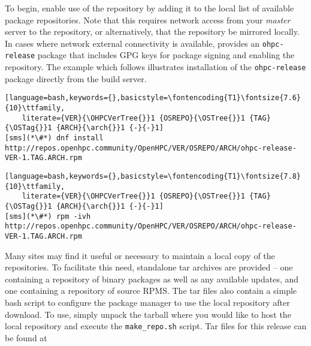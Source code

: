 To begin, enable use of the \OHPC{} repository by adding it to the local list
of available package repositories. Note that this requires network access from
your {\em master} server to the \OHPC{} repository, or alternatively, that
the \OHPC{} repository be mirrored locally.  In cases where network external
connectivity is available, \OHPC{} provides an \texttt{ohpc-release} package
that includes GPG keys for package signing and enabling the repository.  The
example which follows illustrates installation of the \texttt{ohpc-release}
package directly from the \OHPC{} build server.

\begin{lstlisting}[language=bash,keywords={},basicstyle=\fontencoding{T1}\fontsize{7.6}{10}\ttfamily,
	literate={VER}{\OHPCVerTree{}}1 {OSREPO}{\OSTree{}}1 {TAG}{\OSTag{}}1 {ARCH}{\arch{}}1 {-}{-}1]
[sms](*\#*) dnf install http://repos.openhpc.community/OpenHPC/VER/OSREPO/ARCH/ohpc-release-VER-1.TAG.ARCH.rpm
\end{lstlisting}
\else
\begin{lstlisting}[language=bash,keywords={},basicstyle=\fontencoding{T1}\fontsize{7.8}{10}\ttfamily,
	literate={VER}{\OHPCVerTree{}}1 {OSREPO}{\OSTree{}}1 {TAG}{\OSTag{}}1 {ARCH}{\arch{}}1 {-}{-}1]
[sms](*\#*) rpm -ivh http://repos.openhpc.community/OpenHPC/VER/OSREPO/ARCH/ohpc-release-VER-1.TAG.ARCH.rpm
\end{lstlisting}
\fi

\begin{center}
\begin{tcolorbox}[]
\small Many sites may find it useful or necessary to maintain a local copy of the
\OHPC{} repositories. To facilitate this need, standalone tar
archives are provided -- one containing a repository of binary packages as well as any
available updates, and one containing a repository of source RPMS. The tar files
also contain a simple bash script to configure the package manager to use the
local repository after download. To use, simply unpack the tarball where you
would like to host the local repository and execute the \texttt{make\_repo.sh} script.
Tar files for this release can be found at \href{http://repos.openhpc.community/dist/\OHPCVersion}
        {\color{blue}{http://repos.openhpc.community/dist/\OHPCVersion}}
\end{tcolorbox}
\end{center}

